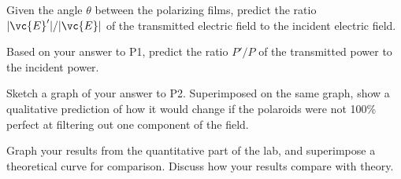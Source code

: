 \prelabquestion Given the angle $\theta$ between the polarizing films, predict the 
ratio $|\vc{E}'|/|\vc{E}|$ of the transmitted electric field to the incident
electric field.

\prelabquestion Based on your answer to P1, predict the ratio $P'/P$ of the transmitted
power to the incident power.

\prelabquestion Sketch a graph of your answer to P2. Superimposed on the same graph, show
a qualitative prediction of how it would change if the polaroids were not
100\% perfect at filtering out one component of the field.

\analysis

Graph your results from the quantitative part of the lab, and superimpose a
theoretical curve for comparison. Discuss how your results
compare with theory.

